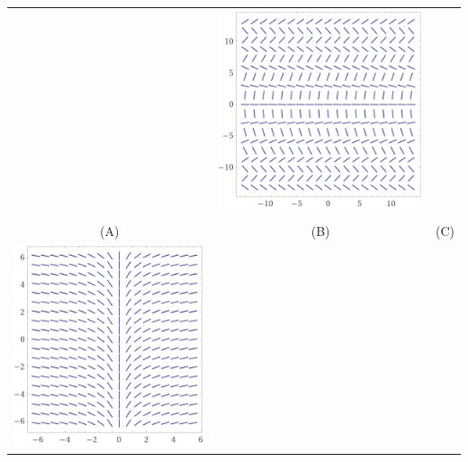 \begin{tabular}{ccc}
		& \includegraphics*[height=\len]{images/module9-graph3} \\
		(A) & (B) & (C) \\[10pt]
	\includegraphics*[height=\len]{images/module9-graph4}

\end{tabular}
